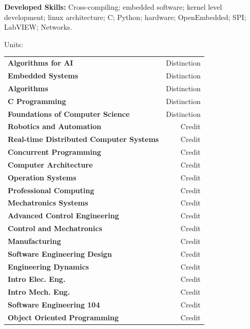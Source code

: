 \documentclass[10pt, a4paper]{report}
\newcommand{\engineering}[1]{}
\renewcommand{\engineering}[1]{#1}
\begin{document}
{\bf Developed Skills:} Cross-compiling; embedded software; kernel level development; linux architecture; C; Python; hardware; OpenEmbedded; SPI; LabVIEW; Networks.
	\engineering{
	\begin{basedescript}{\desclabelstyle{\pushlabel}\desclabelwidth{5em}}
	\item[Units:] 

\begin{tabular}[h]{lr}
{\bf Algorithms for AI} & Distinction\\
{\bf Embedded Systems} & Distinction\\
{\bf Algorithms} & Distinction\\
{\bf C Programming} & Distinction\\
{\bf Foundations of Computer Science} & Distinction\\
{\bf Robotics and Automation} & Credit\\
{\bf Real-time Distributed Computer Systems} & Credit\\
{\bf Concurrent Programming} & Credit\\
{\bf Computer Architecture} & Credit\\
{\bf Operation Systems} & Credit\\
{\bf Professional Computing} & Credit\\
{\bf Mechatronics Systems} & Credit\\
{\bf Advanced Control Engineering} & Credit\\
{\bf Control and Mechatronics} & Credit\\
{\bf Manufacturing} & Credit\\
{\bf Software Engineering Design} & Credit\\
{\bf Engineering Dynamics} & Credit\\
{\bf Intro Elec. Eng.} & Credit\\
{\bf Intro Mech. Eng.} & Credit\\
{\bf Software Engineering 104} & Credit\\
{\bf Object Oriented Programming} & Credit \\
\end{tabular}
	\end{basedescript}
	}
\end{document}
